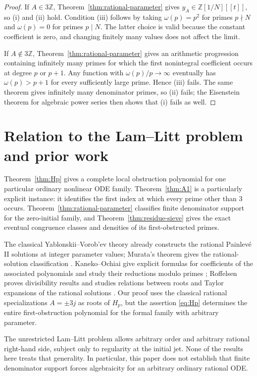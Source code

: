 \documentclass[11pt,a4paper,reqno]{amsart}
\theoremstyle{definition}
\theoremstyle{remark}
\newcommand{\Z}{\mathbb Z}
\begin{document}
\begin{proof}
If $A\in3\Z$, Theorem~\ref{thm:rational-parameter} gives $y_A\in\Z[1/N][[t]]$, so (i) and (ii) hold. Condition (iii) follows by taking $\omega(p)=p^2$ for primes $p\nmid N$ and $\omega(p)=0$ for primes $p\mid N$. The latter choice is valid because the constant coefficient is zero, and changing finitely many values does not affect the limit.

If $A\notin3\Z$, Theorem~\ref{thm:rational-parameter} gives an arithmetic progression containing infinitely many primes for which the first nonintegral coefficient occurs at degree $p$ or $p+1$. Any function with $\omega(p)/p\to\infty$ eventually has $\omega(p)>p+1$ for every sufficiently large prime. Hence (iii) fails. The same theorem gives infinitely many denominator primes, so (ii) fails; the Eisenstein theorem for algebraic power series then shows that (i) fails as well.
\end{proof}

\section{Relation to the Lam--Litt problem and prior work}

Theorem~\ref{thm:Hp} gives a complete local obstruction polynomial for one particular ordinary nonlinear ODE family. Theorem~\ref{thm:A1} is a particularly explicit instance: it identifies the first index at which every prime other than $3$ occurs. Theorem~\ref{thm:rational-parameter} classifies finite denominator support for the zero-initial family, and Theorem~\ref{thm:residue-sieve} gives the exact eventual congruence classes and densities of its first-obstructed primes.

The classical Yablonskii--Vorob'ev theory already constructs the rational Painlev\'e II solutions at integer parameter values; Murata's theorem gives the rational-solution classification \cite{Murata}. Kaneko--Ochiai give explicit formulas for coefficients of the associated polynomials and study their reductions modulo primes \cite{KanekoOchiai}; Roffelsen proves divisibility results and studies relations between roots and Taylor expansions of the rational solutions \cite{Roffelsen}. Our proof uses the classical rational specializations $A=\pm3j$ as roots of $H_p$, but the assertion \eqref{eq:Hp} determines the entire first-obstruction polynomial for the formal family with arbitrary parameter.

The unrestricted Lam--Litt problem allows arbitrary order and arbitrary rational right-hand side, subject only to regularity at the initial jet. None of the results here treats that generality. In particular, this paper does not establish that finite denominator support forces algebraicity for an arbitrary ordinary rational ODE.
\end{document}
